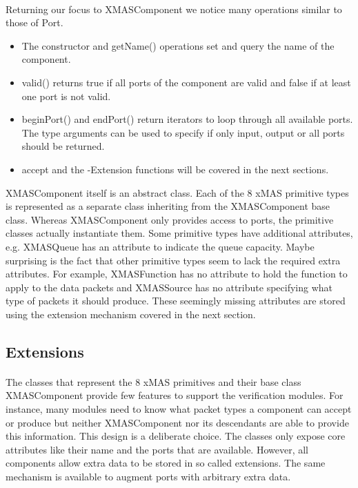 \documentclass[a4paper,11pt]{article}
\begin{document}
\paragraph{}
Returning our focus to XMASComponent we notice many operations similar to those of Port.
\begin{itemize}
 \item The constructor and getName() operations set and query the name of the component.
 \item valid() returns true if all ports of the component are valid and false if at least one port is not valid.
 \item beginPort() and endPort() return iterators to loop through all available ports. The type arguments
 can be used to specify if only input, output or all ports should be returned.
 \item accept and the -Extension functions will be covered in the next sections.
\end{itemize}

XMASComponent itself is an abstract class. Each of the 8 xMAS primitive types is represented
as a separate class inheriting from the XMASComponent base class. Whereas XMASComponent only provides
access to ports, the primitive classes actually instantiate them. Some primitive types have additional
attributes, e.g. XMASQueue has an attribute to indicate the queue capacity. Maybe surprising is the 
fact that other primitive types seem to lack the required extra attributes. For example, XMASFunction
has no attribute to hold the function to apply to the data packets and XMASSource has no attribute
specifying what type of packets it should produce. These seemingly missing attributes are stored using
the extension mechanism covered in the next section.



\subsection{Extensions}

\paragraph{}
The classes that represent the 8 xMAS primitives and their base class XMASComponent provide few features
to support the verification modules. For instance, many modules need to know what packet types a component can
accept or produce but neither XMASComponent nor its descendants are able to provide this information.
This design is a deliberate choice. The classes only expose core attributes like their name and the
ports that are available. However, all components allow extra data to be stored in so called extensions.
The same mechanism is available to augment ports with arbitrary extra data.
\end{document}
